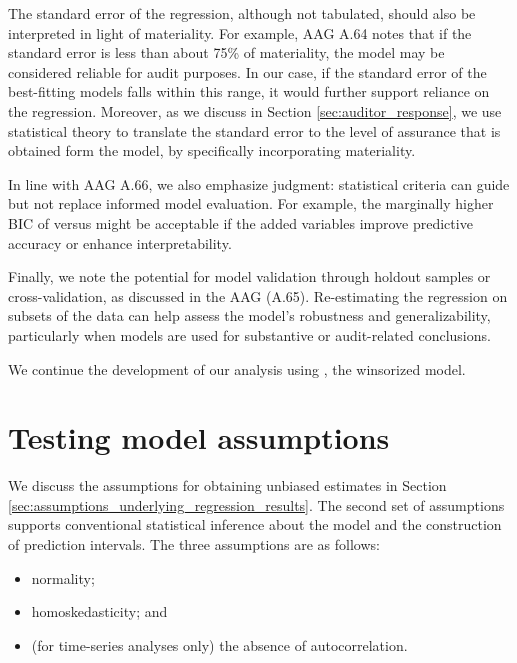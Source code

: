 The standard error of the regression, although not tabulated, should also be interpreted in light of materiality. For example, AAG A.64 notes that if the standard error is less than about 75\% of materiality, the model may be considered reliable for audit purposes. In our case, if the standard error of the best-fitting models falls within this range, it would further support reliance on the regression. Moreover, as we discuss in Section \ref{sec:auditor_response}, we use statistical theory to translate the standard error to the level of assurance that is obtained form the model, by specifically incorporating materiality.

In line with AAG A.66, we also emphasize judgment: statistical criteria can guide but not replace informed model evaluation. For example, the marginally higher BIC of  versus  might be acceptable if the added variables improve predictive accuracy or enhance interpretability.

Finally, we note the potential for model validation through holdout samples or cross-validation, as discussed in the AAG (A.65). Re-estimating the regression on subsets of the data can help assess the model’s robustness and generalizability, particularly when models are used for substantive or audit-related conclusions.

\bigskip
We continue the development of our analysis using , the winsorized model.


\section{Testing model assumptions}
\label{sec:testing_model_assumptions}

We discuss the assumptions for obtaining unbiased estimates in Section \ref{sec:assumptions_underlying_regression_results}. The second set of assumptions supports conventional statistical inference about the model and the construction of prediction intervals. The three assumptions are as follows:

\begin{itemize}
\item normality;
\item homoskedasticity; and
\item (for time-series analyses only) the absence of autocorrelation.
\end{itemize}

